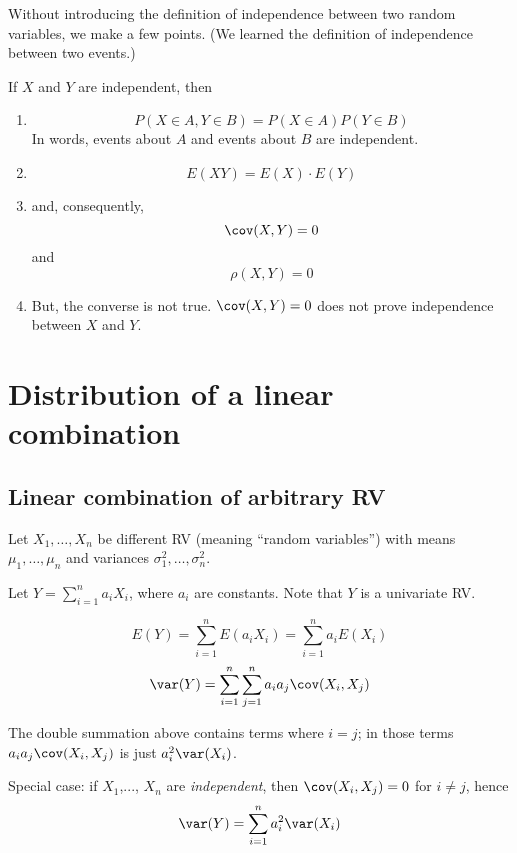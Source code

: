 \documentclass[12pt]{article}
\begin{document}
Without introducing the definition of independence between two random
variables,
we make a few points.
(We learned the definition of independence between two
events.)

If $X$ and $Y$ are independent, then
\begin{enumerate}
\item
\[
    P(X\in A, Y\in B) = P(X\in A) P(Y\in B)
\]
In words, events about $A$ and events about $B$
are independent.
\item
\[
E(XY) = E(X)\cdot E(Y)
\]
\item
and, consequently,
\[
\cov(X, Y) = 0
\]
and
\[
\rho(X,Y) = 0
\]
\item
But, the converse is not true.
$\cov(X, Y) = 0$ does not prove independence between $X$ and $Y$.
\end{enumerate}


\section{Distribution of a linear combination}

\subsection{Linear combination of arbitrary RV}

Let $X_1,\dotsc, X_n$ be different RV (meaning ``random variables'')
with means $\mu_1,\dotsc, \mu_n$
and variances $\sigma^2_1,\dotsc, \sigma^2_n$.


Let $Y = \sum_{i=1}^n a_iX_i$, where $a_i$ are constants.
Note that $Y$ is a univariate RV.

\alert[Proposition]%
\[
E(Y)
= \sum_{i=1}^n E(a_iX_i)
= \sum_{i=1}^n a_iE(X_i)
\]
\[
\var(Y)
= \sum_{i=1}^n \sum_{j=1}^n a_i a_j \cov(X_i, X_j)
\]

\alert The double summation above contains terms
where $i = j$; in those terms
$a_ia_j\cov(X_i,X_j)$ is just $a_i^2\var(X_i)$.

Special case: if $X_1$,..., $X_n$ are \emph{independent},
then
$\cov(X_i, X_j) = 0$ for $i \ne j$, hence
\[
\var(Y)
= \sum_{i=1}^n a_i^2 \var(X_i)
\]

\end{document}
